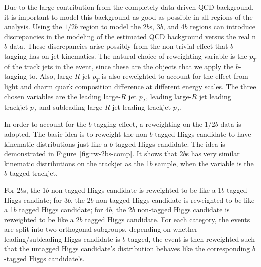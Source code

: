 Due to the large contribution from the completely data-driven QCD background, it is important to model this background as good as possible in all regions of the analysis. Using the $1/2b$ region to model the 2$b$s, 3$b$, and 4$b$ regions can introduce discrepancies in the modeling of the estimated QCD background versus the real n$b$ data. These discrepancies arise possibly from the non-trivial effect that $b$-tagging has on jet kinematics. The natural choice of reweighting variable is the $p_{T}$ of the track jets in the event, since these are the objects that we apply the $b$-tagging to. Also, large-$R$ jet $p_{T}$ is also reweighted to account for the effect from light and charm quark composition difference at different energy scales. The three chosen variables are the leading large-$R$ jet $p_{T}$, leading large-$R$ jet leading trackjet $p_{T}$ and subleading large-$R$ jet leading trackjet $p_{T}$.

In order to account for the $b$-tagging effect, a reweighting on the $1/2b$ data is adopted. The basic idea is to reweight the non $b$-tagged Higgs candidate to have kinematic distributions just like a $b$-tagged Higgs candidate. The idea is demonstrated in Figure~\ref{fig:rw-2bs-comp}. It shows that 2$b$s has very similar kinematic distributions on the trackjet \pt as the 1$b$ sample, when the variable is the $b$ tagged trackjet. 

For 2$b$s, the 1$b$ non-tagged Higgs candidate is reweighted to be like a 1$b$ tagged Higgs candiate; for 3$b$, the 2$b$ non-tagged Higgs candidate is reweighted to be like a 1$b$ tagged Higgs candidate; for 4$b$, the 2$b$ non-tagged Higgs candidate is reweighted to be like a 2$b$ tagged Higgs candidate. For each category, the events are split into two orthogonal subgroups, depending on whether leading/subleading Higgs candidate is $b$-tagged, the event is then reweighted such that the untagged Higgs candidate's distribution behaves like the corresponding $b$-tagged Higgs candidate's.

